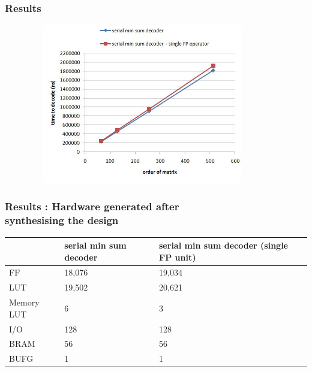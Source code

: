 \documentclass[xcolor=dvipsname]
{beamer}
\begin{document}
\begin{frame}[t]
\frametitle{Results}  
\vspace{-0.5cm}
\begin{figure}

       \includegraphics[height=7cm,width=10cm]{serialresult2}
       \end{figure}
\end{frame}

\begin{frame}[t]
\frametitle{Results : Hardware generated after \\ synthesising the design}
\begin{table}[]
\centering
\begin{tabular}{|p{1.3cm}|p{3.5cm}|p{3.5cm}|}
\hline
	& serial min sum decoder & serial min sum decoder \newline
	(single FP unit)  \\ \hline
FF & 18,076		&19,034		 \\ \hline
LUT & 19,502  &20,621  \\ \hline
Memory LUT & 6 & 3  \\ \hline 
I/O & 128 & 128  \\ \hline
BRAM & 56 & 56  \\ \hline
BUFG  & 1 & 1  \\ \hline
\end{tabular}
\end{table}
\end{frame}

									
\end{document}
